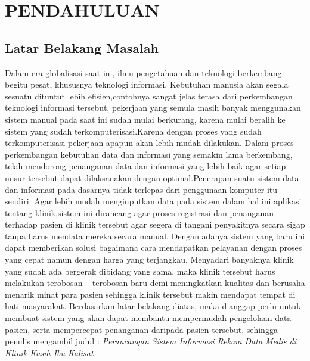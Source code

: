\documentclass{jtetiproposalskripsi}
\begin{document}
\tableofcontents
{}
\clearpage{}\setcounter{page}{1}

\chapter{PENDAHULUAN}

\section{Latar Belakang Masalah}
Dalam era globalisasi saat ini, ilmu pengetahuan dan teknologi berkembang begitu pesat, khususnya teknologi informasi. Kebutuhan manusia akan segala sesuatu dituntut lebih efisien,contohnya sangat jelas terasa dari perkembangan teknologi informasi tersebut, pekerjaan yang semula masih banyak menggunakan sistem manual pada saat ini sudah mulai berkurang, karena mulai beralih ke sistem yang sudah terkomputerisasi.Karena dengan proses yang sudah terkomputerisasi pekerjaan apapun akan lebih mudah dilakukan. Dalam proses perkembangan kebutuhan data dan informasi yang semakin lama berkembang, telah mendorong penanganan data dan informasi yang lebih baik agar setiap unsur tersebut dapat dilaksanakan dengan optimal.Penerapan suatu sistem data dan informasi pada dasarnya tidak terlepas dari penggunaan komputer itu sendiri. Agar lebih mudah menginputkan data pada sistem dalam hal ini aplikasi tentang klinik,sistem ini dirancang agar proses registrasi dan penanganan terhadap pasien di klinik tersebut agar segera di tangani penyakitnya secara sigap tanpa harus mendata mereka secara manual. Dengan adanya sistem yang baru ini dapat memberikan solusi bagaimana cara mendapatkan pelayanan dengan proses yang cepat namun dengan harga yang terjangkau. Menyadari banyaknya klinik yang sudah ada bergerak dibidang yang sama, maka klinik tersebut harus melakukan terobosan – terobosan baru demi meningkatkan kualitas dan berusaha menarik minat para pasien sehingga klinik tersebut makin mendapat tempat di hati masyarakat. Berdasarkan latar belakang diatas, maka dianggap perlu untuk membuat sistem yang akan dapat membantu mempermudah pengelolaan data pasien, serta mempercepat penanganan daripada pasien tersebut, sehingga penulis mengambil judul : \textit{Perancangan Sistem Informasi Rekam Data Medis di Klinik Kasih Ibu Kalisat}
\end{document}
